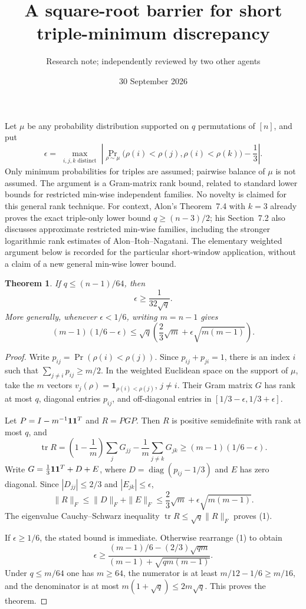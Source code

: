 \documentclass[11pt]{article}
\title{A square-root barrier for short triple-minimum discrepancy}
\author{Research note; independently reviewed by two other agents}
\date{30 September 2026}
\newtheorem{theorem}{Theorem}
\begin{document}
\maketitle

Let $\mu$ be any probability distribution supported on $q$ permutations
of $[n]$, and put
\[
 \epsilon=\max_{\substack{i,j,k\text{ distinct}}}
 \left|\Pr_{\rho\sim\mu}\bigl(\rho(i)<\rho(j),\rho(i)<\rho(k)\bigr)
                       -\frac13\right|.
\]
Only minimum probabilities for triples are assumed; pairwise balance of
$\mu$ is not assumed. The argument is a Gram-matrix rank bound, related
to standard lower bounds for restricted min-wise independent families.
No novelty is claimed for this general rank technique.
For context, Alon's Theorem~7.4 with $k=3$ already proves the exact
triple-only lower bound $q\ge(n-3)/2$; his Section~7.2 also discusses
approximate restricted min-wise families, including the stronger
logarithmic rank estimates of Alon--Itoh--Nagatani. The elementary
weighted argument below is recorded for the particular short-window
application, without a claim of a new general min-wise lower bound.

\begin{theorem}\label{main}
If $q\le(n-1)/64$, then
\[
 \epsilon\ge\frac1{32\sqrt q}.
\]
More generally, whenever $\epsilon<1/6$, writing $m=n-1$ gives
\[
 (m-1)(1/6-\epsilon)
 \le \sqrt q\left(\frac23\sqrt m+
                    \epsilon\sqrt{m(m-1)}\right).\tag{1}
\]
\end{theorem}
\begin{proof}
Write $p_{ij}=\Pr(\rho(i)<\rho(j))$. Since $p_{ij}+p_{ji}=1$,
there is an index $i$ such that $\sum_{j\ne i}p_{ij}\ge m/2$.
In the weighted Euclidean space on the support of $\mu$, take the
$m$ vectors $v_j(\rho)=\mathbf1_{\rho(i)<\rho(j)}$, $j\ne i$.
Their Gram matrix $G$ has rank at most $q$, diagonal entries $p_{ij}$,
and off-diagonal entries in $[1/3-\epsilon,1/3+\epsilon]$.

Let $P=I-m^{-1}{\bf1}{\bf1}^{T}$ and $R=PGP$. Then $R$ is positive
semidefinite with rank at most $q$, and
\[
 \operatorname{tr}R
 =\left(1-\frac1m\right)\sum_jG_{jj}
       -\frac1m\sum_{j\ne k}G_{jk}
 \ge(m-1)(1/6-\epsilon).
\]
Write $G=\frac13{\bf1}{\bf1}^{T}+D+E$, where
$D=\operatorname{diag}(p_{ij}-1/3)$ and $E$ has zero diagonal.
Since $|D_{jj}|\le2/3$ and $|E_{jk}|\le\epsilon$,
\[
 \|R\|_F\le\|D\|_F+\|E\|_F
 \le\frac23\sqrt m+\epsilon\sqrt{m(m-1)}.
\]
The eigenvalue Cauchy--Schwarz inequality
$\operatorname{tr}R\le\sqrt q\|R\|_F$ proves (1).

If $\epsilon\ge1/6$, the stated bound is immediate. Otherwise rearrange
(1) to obtain
\[
 \epsilon\ge
 \frac{(m-1)/6-(2/3)\sqrt{qm}}
      {(m-1)+\sqrt{qm(m-1)}}.
\]
Under $q\le m/64$ one has $m\ge64$, the numerator is at least
$m/12-1/6\ge m/16$, and the denominator is at most
$m(1+\sqrt q)\le2m\sqrt q$. This proves the theorem.
\end{proof}
\end{document}
